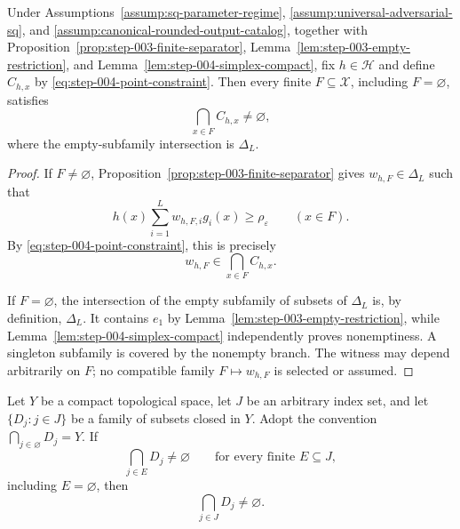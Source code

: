 \begin{lemma}
\label{lem:step-004-finite-intersections}
Under Assumptions~\ref{assump:sq-parameter-regime},
\ref{assump:universal-adversarial-sq}, and
\ref{assump:canonical-rounded-output-catalog}, together with
Proposition~\ref{prop:step-003-finite-separator},
Lemma~\ref{lem:step-003-empty-restriction}, and
Lemma~\ref{lem:step-004-simplex-compact}, fix \(h\in\mathcal H\) and define
\(C_{h,x}\) by \eqref{eq:step-004-point-constraint}.  Then every finite
\(F\subseteq\mathcal X\), including \(F=\varnothing\), satisfies
\begin{equation}
\bigcap_{x\in F}C_{h,x}\ne\varnothing,
\label{eq:step-004-fip}
\end{equation}
where the empty-subfamily intersection is \(\Delta_L\).
\end{lemma}

\begin{proof}
If \(F\ne\varnothing\),
Proposition~\ref{prop:step-003-finite-separator} gives
\(w_{h,F}\in\Delta_L\) such that
\[
h(x)\sum_{i=1}^Lw_{h,F,i}g_i(x)
\ge\rho_{\varepsilon}
\qquad (x\in F).
\]
By \eqref{eq:step-004-point-constraint}, this is precisely
\[
w_{h,F}\in\bigcap_{x\in F}C_{h,x}.
\]

If \(F=\varnothing\), the intersection of the empty subfamily of subsets of
\(\Delta_L\) is, by definition, \(\Delta_L\).  It contains \(e_1\) by
Lemma~\ref{lem:step-003-empty-restriction}, while
Lemma~\ref{lem:step-004-simplex-compact} independently proves nonemptiness.
A singleton subfamily is covered by the nonempty branch.  The witness may
depend arbitrarily on \(F\); no compatible family
\(F\mapsto w_{h,F}\) is selected or assumed.
\end{proof}

\begin{lemma}
\label{lem:step-004-compact-fip}
Let \(Y\) be a compact topological space, let \(J\) be an arbitrary index
set, and let \(\{D_j:j\in J\}\) be a family of subsets closed in \(Y\).
Adopt the convention \(\bigcap_{j\in\varnothing}D_j=Y\).  If
\[
\bigcap_{j\in E}D_j\ne\varnothing
\qquad\text{for every finite }E\subseteq J,
\]
including \(E=\varnothing\), then
\[
\bigcap_{j\in J}D_j\ne\varnothing.
\]
\end{lemma}

